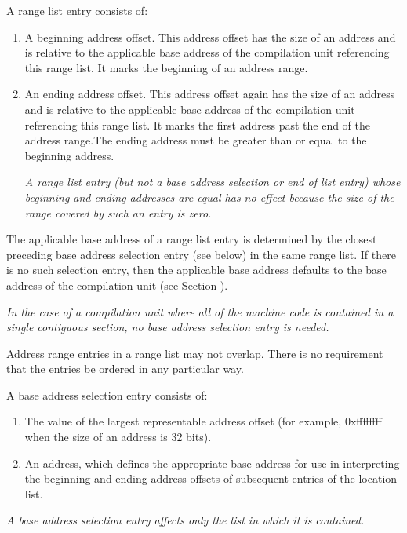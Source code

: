 A range list entry consists of:

\begin{enumerate}[1]
\item A beginning address offset. This address offset has the size of an address and is relative to
the applicable base address of the compilation unit referencing this range list. It marks the
beginning of an address range.

\item An ending address offset. This address offset again has the size of an address and is relative
to the applicable base address of the compilation unit referencing this range list. It marks the
first address past the end of the address range.The ending address must be greater than or
equal to the beginning address.

\textit{A range list entry (but not a base address selection or end of list entry) whose beginning and
ending addresses are equal has no effect because the size of the range covered by such an
entry is zero.}
\end{enumerate}

The applicable base address of a range list entry is determined
by the closest preceding base address selection entry (see
below) in the same range list. If there is no such selection
entry, then the applicable base address defaults to the base
address of the compilation unit 
(see Section ).

\textit{In the case of a compilation unit where all of the machine
code is contained in a single contiguous section, no base
address selection entry is needed.}

Address range entries in
a range list may not overlap. There is no requirement that
the entries be ordered in any particular way.

A base address selection entry consists of:

\begin{enumerate}[1]
\item The value of the largest representable address offset (for example, 0xffffffff when the size of
an address is 32 bits).

\item An address, which defines the appropriate base address for use in interpreting the beginning
and ending address offsets of subsequent entries of the location list.
\end{enumerate}
\textit{A base address selection entry 
affects only the list in which it is contained.}


